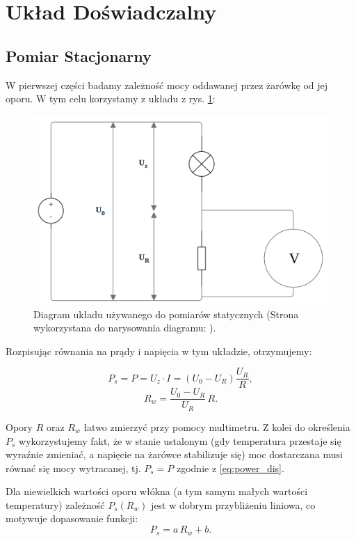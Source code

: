 \documentclass[12pt]{article}
\begin{document}
\section{Układ Doświadczalny}
\subsection{Pomiar Stacjonarny}
W pierwszej części badamy zależność mocy oddawanej przez żarówkę od jej oporu. W tym celu korzystamy z układu z rys. \ref{fig:pomiar_stac}:
\begin{figure}[H]
    \centering
    \includegraphics[scale=0.25]{static}
    \caption{Diagram układu używanego do pomiarów statycznych (Strona wykorzystana do narysowania diagramu: \cite{diagram}).}
    \label{fig:pomiar_stac}
\end{figure}

Rozpisując równania na prądy i napięcia w tym układzie, otrzymujemy:

\begin{equation}
    P_s = P = U_z \cdot I = (U_0 - U_R) \frac{U_R}{R},
    \label{eq:power_dis}
\end{equation}
\begin{equation}
    R_w = \frac{U_0 - U_R}{U_R}\,R.
    \label{eq:bulb_resistance}
\end{equation}

Opory $R$ oraz $R_w$ łatwo zmierzyć przy pomocy multimetru. Z kolei do określenia $P_s$ wykorzystujemy fakt, że w stanie ustalonym (gdy temperatura przestaje się wyraźnie zmieniać,
a napięcie na żarówce stabilizuje się) moc dostarczana musi równać się mocy wytracanej, tj. $P_s = P$ zgodnie z \eqref{eq:power_dis}.

Dla niewielkich wartości oporu włókna (a tym samym małych wartości temperatury) zależność $P_s(R_w)$ jest w dobrym przybliżeniu liniowa, co motywuje dopasowanie funkcji:
\begin{equation}
    P_s = a\,R_w + b.
    \label{eq:power_line}
\end{equation}
\end{document}
